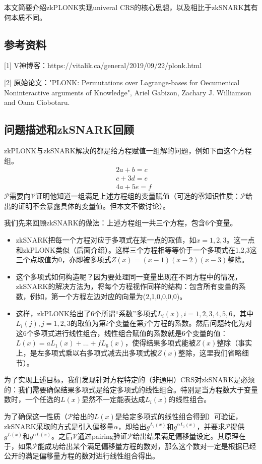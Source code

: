 \documentclass[12pt]{article}
\newcommand{\zk}{zkPLONK}
\newcommand{\pp}{$\mathcal{P}$}
\newcommand{\vv}{$\mathcal{V}$}
\begin{document}
本文简要介绍\zk 实现univeral CRS的核心思想，以及相比于zkSNARK其有何本质不同。
\subsection{参考资料}
[1] V神博客：https://vitalik.ca/general/2019/09/22/plonk.html

[2] 原始论文："PLONK: Permutations over Lagrange-bases for Oecumenical Noninteractive arguments of Knowledge", Ariel Gabizon, Zachary J. Williamson and Oana Ciobotaru.
\subsection{问题描述和zkSNARK回顾}
\zk 与zkSNARK解决的都是给方程赋值一组解的问题，例如下面这个方程组。
\begin{align*}
	&2a+b=c \\
	&c+3d=e \\
	&4a+5e=f
\end{align*}
\pp 需要向\vv 证明他知道一组满足上述方程组的变量赋值（可选的零知识性质：\pp 给出的证明不会暴露具体的变量值。但本文不做讨论）。

我们先来回顾zkSNARK的做法：上述方程组一共三个方程，包含6个变量。

\begin{itemize}
\item zkSNARK把每一个方程对应于多项式在某一点的取值，如$x=1,2,3$。这一点和\zk 类似（后面介绍）。这样三个方程相等等价于一个多项式在1,2,3这三个点取值为0，亦即被多项式$Z(x)=(x-1)(x-2)(x-3)$整除。
\item 这个多项式如何构造呢？因为要处理同一变量出现在不同方程中的情况，zkSNARK的解决方法为，将每个方程视作同样的结构：包含所有变量的系数，例如，第一个方程左边对应的向量为(2,1,0,0,0,0)。
\item 这样，\zk 给出了6个所谓“系数”多项式$L_i(x),i=1,2,3,4,5,6$，其中$L_i(j),j=1,2,3$的取值为第$i$个变量在第$j$个方程的系数。然后问题转化为对这6个多项式进行线性组合，线性组合赋值的系数就是6个变量的值：$L(x)=aL_1(x)+...+fL_6(x)$，使得结果多项式能被$Z(x)$整除（事实上，是左多项式乘以右多项式减去出多项式被$Z(x)$整除，这里我们省略细节）。
\end{itemize}
为了实现上述目标，我们发现针对方程特定的（非通用）CRS对zkSNARK是必须的：我们需要确保结果多项式是给定多项式的线性组合。特别是当方程数大于变量数时，一个任选的$L(x)$显然不一定能表达成$L_i(x)$的线性组合。

为了确保这一性质（\pp 给出的$L(x)$是给定多项式的线性组合得到）可验证，zkSNARK采取的方式是引入偏移量$\alpha$，即给出$g^{L_i(x)}$和$g^{\alpha L_i(x)}$，并要求\pp 提供$g^{L(x)}$和$g^{\alpha L(x)}$。之后\vv 通过pairing验证\pp 给出结果满足偏移量设定。其原理在于，如果\pp 能成功给出某个满足偏移量方程的数对，那么这个数对一定是根据已经公开的满足偏移量方程的数对进行线性组合得出。
\end{document}
